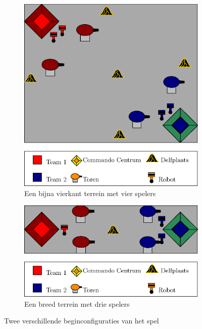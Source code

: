     \begin{figure}[h]
        \begin{subfigure}{0.5\linewidth}
            \includegraphics[width=\textwidth]{../Graphics/Map1.eps}
            \caption{Een bijna vierkant terrein met vier spelers}
            \label{fig:map1}
        \end{subfigure}\hspace{10mm}
        \begin{subfigure}{0.5\textwidth}
                \includegraphics[width=\textwidth]{../Graphics/Map2.eps}
                \caption{Een breed terrein met drie spelers}
                \label{fig:map2}
        \end{subfigure}
        \caption{Twee verschillende beginconfiguraties van het spel}
    \end{figure}

